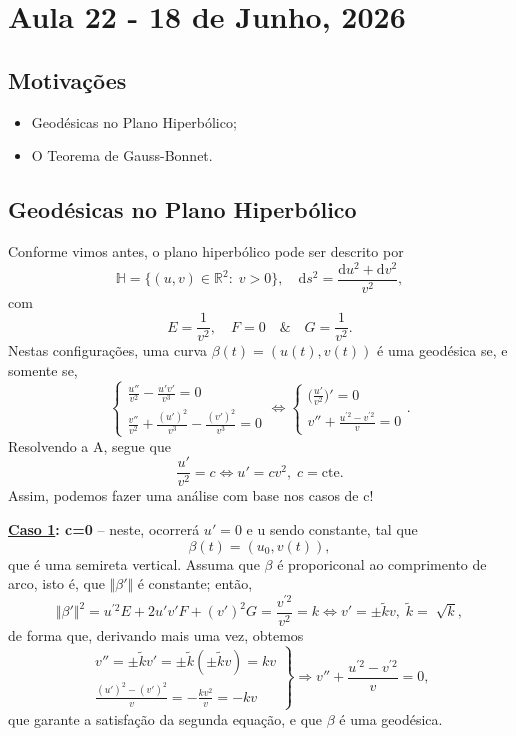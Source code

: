 \documentclass[../differential_geometry.tex]{subfiles}
\begin{document}
\section{Aula 22 - 18 de Junho, 2026}
\subsection{Motivações}
\begin{itemize}
	\item Geodésicas no Plano Hiperbólico;
	\item O Teorema de Gauss-Bonnet.
\end{itemize}
\subsection{Geodésicas no Plano Hiperbólico}
Conforme vimos antes, o plano hiperbólico pode ser descrito por
\[
	\mathbb{H} = \{(u, v)\in \mathbb{R}^{2}:\; v> 0\}, \quad \mathrm{d}s^{2} = \frac{\mathrm{d}u^{2} + \mathrm{d}v^{2}}{v^{2}},
\]
com
\[
	E = \frac{1}{v^{2}}, \quad F = 0 \quad\&\quad G = \frac{1}{v^{2}}.
\]
Nestas configurações, uma curva \(\beta (t) = (u(t), v(t))\) é uma geodésica se, e somente se,
\[
	\left\{\begin{array}{ll}
		\frac{u''}{v^{2}} - \frac{u'v'}{v^{3}} = 0 \\
		\frac{v''}{v^{2}} + \frac{(u')^{2}}{v^{3}}-\frac{(v')^{2}}{v^{3}} = 0
	\end{array}\right. \Longleftrightarrow \left\{\begin{array}{ll}
		\biggl(\frac{u'}{v^{2}}\biggr)' = 0 \\
		v'' + \frac{u^{'2}-v^{'2}}{v} = 0
	\end{array}\right..
\]
Resolvendo a A, segue que
\[
	\frac{u'}{v^{2}} = c \Longleftrightarrow u'=cv^{2},\; c = \mathrm{cte}.
\]
Assim, podemos fazer uma análise com base nos casos de c!

\textbf{\underline{Caso 1}: c=0} -- neste, ocorrerá \(u'= 0\) e u sendo constante, tal que
\[
	\beta (t) = (u_{0}, v(t)),
\]
que é uma semireta vertical.
Assuma que \(\beta \) é proporiconal ao comprimento de arco, isto é, que \(\Vert \beta ' \Vert\) é constante; então,
\[
	\Vert \beta ' \Vert^{2} = u^{'2}E + 2u'v'F + (v')^{2}G = \frac{v^{'2}}{v^{2}} = k \Longleftrightarrow v'=\pm \tilde{k}v, \; \tilde{k}= \sqrt[]{k},
\]
de forma que, derivando mais uma vez, obtemos
\[
	\left.\begin{array}{ll}
		v''=\pm \tilde{k}v'=\pm \tilde{k}(\pm \tilde{k}v)=kv \\
		\frac{(u')^{2}-(v')^{2}}{v}=-\frac{kv^{2}}{v} = -kv
	\end{array}\right\} \Rightarrow v''+\frac{u^{'2}-v^{'2}}{v} = 0,
\]
que garante a satisfação da segunda equação, e que \(\beta \) é uma geodésica.
\end{document}
